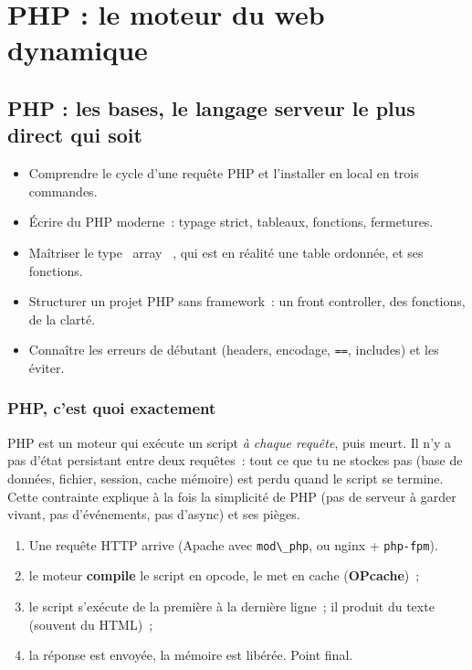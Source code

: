 \documentclass[12pt,a4paper,twoside,openright]{book}
\begin{document}
\part{PHP : le moteur du web dynamique}
\chapter{PHP : les bases, le langage serveur le plus direct qui soit}
\label{ch-php-bases}

\begin{objectif}
\begin{itemize}
  \item Comprendre le cycle d'une requ\^ete PHP et l'installer en local en trois commandes.
  \item \'Ecrire du PHP moderne~: typage strict, tableaux, fonctions, fermetures.
  \item Ma\^itriser le type \og ~array~ \fg{}, qui est en r\'ealit\'e une table ordonn\'ee, et ses fonctions.
  \item Structurer un projet PHP sans framework~: un front controller, des fonctions, de la clart\'e.
  \item Conna\^itre les erreurs de d\'ebutant (headers, encodage, \verb|==|, includes) et les \'eviter.
\end{itemize}
\end{objectif}

\section{PHP, c'est quoi exactement}

PHP est un moteur qui ex\'ecute un script \emph{\`a chaque requ\^ete}, puis meurt. Il n'y a pas d'\'etat
persistant entre deux requ\^etes~: tout ce que tu ne stockes pas (base de donn\'ees, fichier, session,
cache m\'emoire) est perdu quand le script se termine. Cette contrainte explique \`a la fois la
simplicit\'e de PHP (pas de serveur \`a garder vivant, pas d'\'ev\'enements, pas d'async) et ses pi\`eges.

\begin{enumerate}
  \item Une requ\^ete HTTP arrive (Apache avec \verb|mod\_php|, ou nginx + \verb|php-fpm|).
  \item le moteur \textbf{compile} le script en opcode, le met en cache (\textbf{OPcache})~;
  \item le script s'ex\'ecute de la premi\`ere \`a la derni\`ere ligne~; il produit du texte (souvent du HTML)~;
  \item la r\'eponse est envoy\'ee, la m\'emoire est lib\'er\'ee. Point final.
\end{enumerate}
\end{document}
